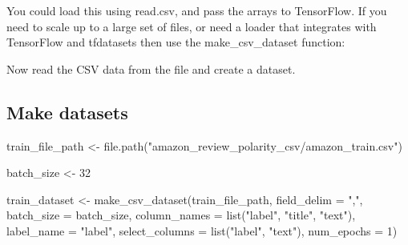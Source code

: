 \documentclass[
]{article}
\newenvironment{Shaded}{}{}
\newcommand{\AttributeTok}[1]{\textcolor[rgb]{0.49,0.56,0.16}{#1}}
\newcommand{\DecValTok}[1]{\textcolor[rgb]{0.25,0.63,0.44}{#1}}
\newcommand{\FunctionTok}[1]{\textcolor[rgb]{0.02,0.16,0.49}{#1}}
\newcommand{\NormalTok}[1]{#1}
\newcommand{\OtherTok}[1]{\textcolor[rgb]{0.00,0.44,0.13}{#1}}
\newcommand{\StringTok}[1]{\textcolor[rgb]{0.25,0.44,0.63}{#1}}
\begin{document}
You could load this using read.csv, and pass the arrays to TensorFlow.
If you need to scale up to a large set of files, or need a loader that
integrates with TensorFlow and tfdatasets then use the
make\_csv\_dataset function:

Now read the CSV data from the file and create a dataset.

\hypertarget{make-datasets}{%
\subsection{Make datasets}\label{make-datasets}}

\begin{Shaded}
\begin{Highlighting}[]
\NormalTok{train\_file\_path }\OtherTok{\textless{}{-}} \FunctionTok{file.path}\NormalTok{(}\StringTok{"amazon\_review\_polarity\_csv/amazon\_train.csv"}\NormalTok{)}

\NormalTok{batch\_size }\OtherTok{\textless{}{-}} \DecValTok{32}

\NormalTok{train\_dataset }\OtherTok{\textless{}{-}} \FunctionTok{make\_csv\_dataset}\NormalTok{(train\_file\_path, }\AttributeTok{field\_delim =} \StringTok{","}\NormalTok{, }\AttributeTok{batch\_size =}\NormalTok{ batch\_size,}
    \AttributeTok{column\_names =} \FunctionTok{list}\NormalTok{(}\StringTok{"label"}\NormalTok{, }\StringTok{"title"}\NormalTok{, }\StringTok{"text"}\NormalTok{), }\AttributeTok{label\_name =} \StringTok{"label"}\NormalTok{, }\AttributeTok{select\_columns =} \FunctionTok{list}\NormalTok{(}\StringTok{"label"}\NormalTok{,}
        \StringTok{"text"}\NormalTok{), }\AttributeTok{num\_epochs =} \DecValTok{1}\NormalTok{)}



\end{Highlighting}
\end{Shaded}
\end{document}
